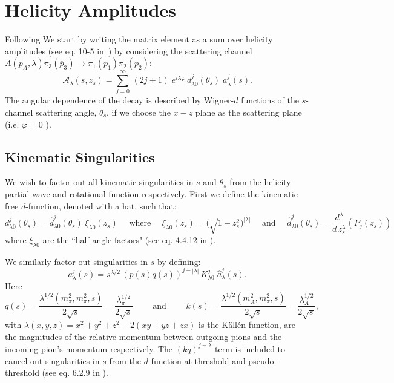 \documentclass[10pt, aps,prd,amsmath,amssymb,superscriptaddress,onecolumn,
nofootinbib,showpacs,preprintnumbers]{revtex4-1}
\begin{document}
\section{Helicity Amplitudes}
Following \cite{Mikhasenko:2017rkh} We start by writing the matrix element as a sum over helicity amplitudes (see eq. 10-5 in~\cite{perl}) by considering the scattering channel \(A(p_A, \lambda) \pi_3(\overline{p}_3) \to  \pi_1(p_1)\pi_2(p_2)\):
  \begin{equation}
    \label{eq:helicity}
    \mathcal{A}_\lambda(s,z_s) = \sum_{j= 0}^\infty \, (2j +1) \; e^{i\lambda\varphi} \, d_{\lambda0}^j(\theta_s) \; a_\lambda^j(s).
  \end{equation}
The angular dependence of the decay is described by Wigner-\(d\) functions of the \(s\)-channel scattering angle, \(\theta_s\), if we choose the \(x-z\) plane as the scattering plane (i.e. \(\varphi = 0 \) ).
\subsection{Kinematic Singularities}
\label{sec:kin-singularities}
We wish to factor out all kinematic singularities in \(s\) and \(\theta_s\) from the helicity partial wave and rotational function respectively. First we define the kinematic-free \(d\)-function, denoted with a hat, such that:
  \begin{equation}
      \label{eq:halfangle}
      d^j_{\lambda 0}(\theta_s) = \hat{d}^j_{\lambda 0}(\theta_s) \; \xi_{\lambda 0}(z_s)
       \quad \text{ where } \quad
      \xi_{\lambda 0}(z_s) = \bigg( \sqrt{ 1- z_s^2} \bigg)^{|\lambda|}
       \quad \text{ and } \quad
      \hat{d}^j_{\lambda 0}(\theta_s) = \frac{d^\lambda}{d \, z_s^\lambda} (P_j(z_s))
  \end{equation}
where \(\xi_{\lambda 0}\) are the ``half-angle factors" (see eq. 4.4.12 in \cite{Collins}).

We similarly factor out singularities in \(s\) by defining:
  \begin{equation}
    \label{eq:kinematicfreepartialwave}
    a^j_\lambda(s) = s^{\lambda/2} \, (p(s)q(s))^{j - |\lambda|} \, K^j_{\lambda 0} \; \hat{a}^j_\lambda(s).
  \end{equation}
Here
  \begin{equation}
    \label{eq:momenta}
    q(s) = \frac{\lambda^{1/2}(m_\pi^2, m_\pi^2, s)}{2\sqrt{s}} = \frac{\lambda_\pi^{1/2}}{2\sqrt{s}} \qquad \text{ and } \qquad k(s) = \frac{\lambda^{1/2}(m_A^2, m_\pi^2, s)}{2\sqrt{s}} = \frac{\lambda_A^{1/2}}{2\sqrt{s}} ,
  \end{equation}
with \(\lambda(x,y,z) = x^2 + y^2 + z^2 - 2 (xy + yz + zx)\) is the K\"{a}ll\'{e}n function, are the magnitudes of  the relative momentum between outgoing pions and the incoming pion's momentum respectively. The \((kq)^{j-\lambda}\) term is included to cancel out singularities in \(s\) from the \(d\)-function at threshold and pseudo-threshold (see eq. 6.2.9 in \cite{Collins}).
\end{document}
